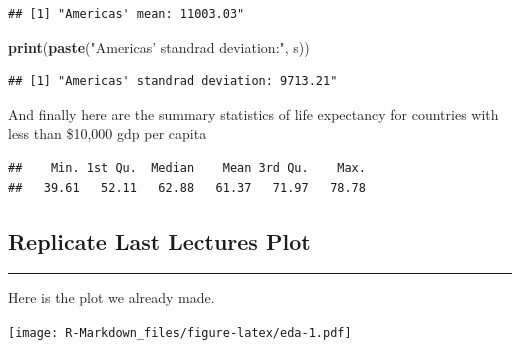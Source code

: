 \documentclass[
]{article}
\newenvironment{Shaded}{\begin{snugshade}}{\end{snugshade}}
\newcommand{\DecValTok}[1]{\textcolor[rgb]{0.00,0.00,0.81}{#1}}
\newcommand{\KeywordTok}[1]{\textcolor[rgb]{0.13,0.29,0.53}{\textbf{#1}}}
\newcommand{\NormalTok}[1]{#1}
\newcommand{\OperatorTok}[1]{\textcolor[rgb]{0.81,0.36,0.00}{\textbf{#1}}}
\newcommand{\StringTok}[1]{\textcolor[rgb]{0.31,0.60,0.02}{#1}}
\begin{document}
\begin{verbatim}
## [1] "Americas' mean: 11003.03"
\end{verbatim}

\begin{Shaded}
\begin{Highlighting}[]
\KeywordTok{print}\NormalTok{(}\KeywordTok{paste}\NormalTok{(}\StringTok{"Americas' standrad deviation:"}\NormalTok{, s))}
\end{Highlighting}
\end{Shaded}

\begin{verbatim}
## [1] "Americas' standrad deviation: 9713.21"
\end{verbatim}

And finally here are the summary statistics of life expectancy for
countries with less than \$10,000 gdp per capita

\begin{Shaded}
\end{Shaded}

\begin{verbatim}
##    Min. 1st Qu.  Median    Mean 3rd Qu.    Max. 
##   39.61   52.11   62.88   61.37   71.97   78.78
\end{verbatim}

\hypertarget{replicate-last-lectures-plot}{%
\subsection{Replicate Last Lectures
Plot}\label{replicate-last-lectures-plot}}

\begin{center}\rule{0.5\linewidth}{0.5pt}\end{center}

Here is the plot we already made.

\texttt{[image: R-Markdown\_files/figure-latex/eda-1.pdf]}
\end{document}
